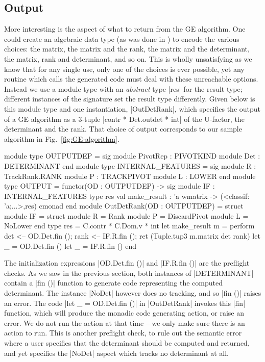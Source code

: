 \documentclass{elsart}
\begin{document}
\subsection{Output}

More interesting is the aspect of what to return from the GE
algorithm.  One could create an algebraic data type (as was done in
\cite{Carette06}) to encode the various choices: the matrix, the
matrix and the rank, the matrix and the determinant, the matrix, rank
and determinant, and so on. This is wholly unsatisfying as we know
that for any single use, only one of the choices is ever possible, yet
any routine which calls the generated code must deal with these
unreachable options.  Instead we use a module type with an
\emph{abstract} type |res| for the result type; different instances of
the signature set the result type differently. Given below is this
module type and one instantiation, |OutDetRank|, which specifies the
output of a GE algorithm as a 3-tuple |contr * Det.outdet * int| of
the U-factor, the determinant and the rank. That choice of output
corresponds to our sample algorithm in Fig.~\ref{fig:GE-algorithm}.

\begin{code}
module type OUTPUTDEP = sig 
    module PivotRep : PIVOTKIND 
    module Det      : DETERMINANT
end
module type INTERNAL_FEATURES = sig
  module R      : TrackRank.RANK
  module P      : TRACKPIVOT
  module L      : LOWER
end
module type OUTPUT = functor(OD : OUTPUTDEP) -> sig
  module IF : INTERNAL_FEATURES
  type res
  val make_result : 'a wmatrix -> (<classif: 'a;...>,res) cmonad
end
module OutDetRank(OD : OUTPUTDEP) = struct
  module IF = struct
    module R   = Rank
    module P   = DiscardPivot
    module L   = NoLower end
  type res = C.contr * C.Dom.v * int
  let make_result m = perform
    det  <-- OD.Det.fin ();
    rank <-- IF.R.fin ();
    ret (Tuple.tup3 m.matrix det rank)
  let _ = OD.Det.fin ()
  let _ = IF.R.fin ()
end
\end{code}

The initialization expressions |OD.Det.fin ()| and |IF.R.fin ()| are
the preflight checks. As we saw in the previous section, both
instances of |DETERMINANT| contain a |fin ()| function to generate
code representing the computed determinant. The instance |NoDet|
however does no tracking, and so |fin ()| raises an error. The code
|let _ = OD.Det.fin ()| in |OutDetRank| invokes this |fin| function,
which will produce the monadic code generating action, or raise an
error. We do not run the action at that time -- we only make sure
there is an action to run. This is another preflight check, to rule
out the semantic error where a user specifies that the determinant
should be computed and returned, and yet specifies the |NoDet| aspect
which tracks no determinant at all.
\end{document}
